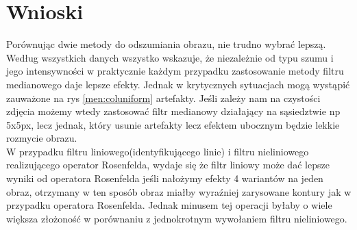 \documentclass{classrep}
\begin{document}
\section{Wnioski}
Porównując dwie metody do odszumiania obrazu, nie trudno wybrać lepszą. Według wszystkich danych wszystko wskazuje, że niezależnie od typu szumu i jego intensywności w praktycznie każdym przypadku zastosowanie metody filtru medianowego daje lepsze efekty. Jednak w krytycznych sytuacjach mogą wystąpić zauważone na rys \ref{men:coluniform} artefakty. Jeśli zależy nam na czystości zdjęcia możemy wtedy zastosować filtr medianowy działający na sąsiedztwie np 5x5px, lecz jednak, który usunie artefakty lecz efektem ubocznym będzie lekkie rozmycie obrazu.
\\W przypadku filtru liniowego(identyfikującego linie) i filtru nieliniowego realizującego operator Rosenfelda, wydaje się że filtr liniowy może dać lepsze wyniki od operatora Rosenfelda jeśli nałożymy efekty 4 wariantów na jeden obraz, otrzymany w ten sposób obraz miałby wyraźniej zarysowane kontury jak w przypadku operatora Rosenfelda. Jednak minusem tej operacji byłaby o wiele większa złożoność w porównaniu z jednokrotnym wywołaniem filtru nieliniowego.

\begin{thebibliography}{8}

\end{thebibliography}
\end{document}

